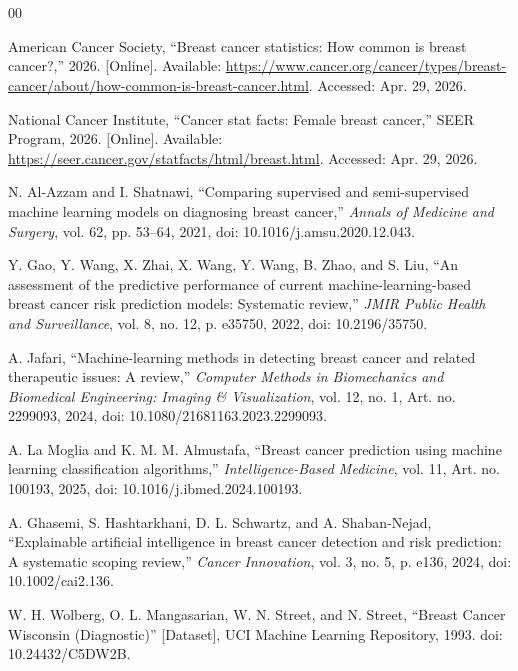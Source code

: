 \documentclass[conference]{IEEEtran}
\begin{document}
\section*{}
\begin{thebibliography}{00}

 American Cancer Society, ``Breast cancer statistics: How common is breast cancer?,'' 2026. [Online]. Available: \url{https://www.cancer.org/cancer/types/breast-cancer/about/how-common-is-breast-cancer.html}. Accessed: Apr. 29, 2026.

 National Cancer Institute, ``Cancer stat facts: Female breast cancer,'' SEER Program, 2026. [Online]. Available: \url{https://seer.cancer.gov/statfacts/html/breast.html}. Accessed: Apr. 29, 2026.

 N. Al-Azzam and I. Shatnawi, ``Comparing supervised and semi-supervised machine learning models on diagnosing breast cancer,'' \textit{Annals of Medicine and Surgery}, vol. 62, pp. 53--64, 2021, doi: 10.1016/j.amsu.2020.12.043.

 Y. Gao, Y. Wang, X. Zhai, X. Wang, Y. Wang, B. Zhao, and S. Liu, ``An assessment of the predictive performance of current machine-learning-based breast cancer risk prediction models: Systematic review,'' \textit{JMIR Public Health and Surveillance}, vol. 8, no. 12, p. e35750, 2022, doi: 10.2196/35750.

 A. Jafari, ``Machine-learning methods in detecting breast cancer and related therapeutic issues: A review,'' \textit{Computer Methods in Biomechanics and Biomedical Engineering: Imaging \& Visualization}, vol. 12, no. 1, Art. no. 2299093, 2024, doi: 10.1080/21681163.2023.2299093.

 A. La Moglia and K. M. M. Almustafa, ``Breast cancer prediction using machine learning classification algorithms,'' \textit{Intelligence-Based Medicine}, vol. 11, Art. no. 100193, 2025, doi: 10.1016/j.ibmed.2024.100193.

 A. Ghasemi, S. Hashtarkhani, D. L. Schwartz, and A. Shaban-Nejad, ``Explainable artificial intelligence in breast cancer detection and risk prediction: A systematic scoping review,'' \textit{Cancer Innovation}, vol. 3, no. 5, p. e136, 2024, doi: 10.1002/cai2.136.

 W. H. Wolberg, O. L. Mangasarian, W. N. Street, and N. Street, ``Breast Cancer Wisconsin (Diagnostic)'' [Dataset], UCI Machine Learning Repository, 1993. doi: 10.24432/C5DW2B.


\end{thebibliography}
\end{document}

